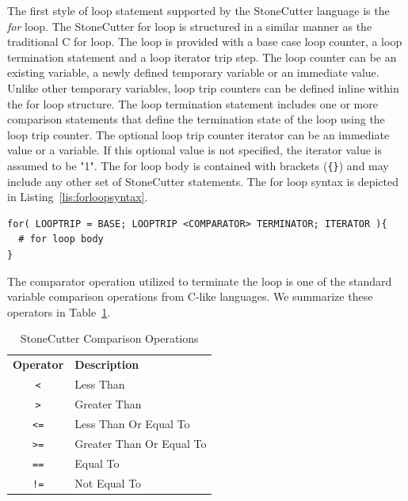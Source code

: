 \documentclass{article}
\begin{document}
The first style of loop statement supported by the StoneCutter language is the 
\textit{for} loop.  The StoneCutter for loop is structured in a similar manner as the 
traditional C for loop.  The loop is provided with a base case loop counter, a loop 
termination statement and a loop iterator trip step.  The loop counter 
can be an existing variable, a newly defined temporary variable or an immediate value.  Unlike other 
temporary variables, loop trip counters can be defined inline within the for loop 
structure.  The loop termination statement includes one or more comparison 
statements that define the termination state of the loop using the loop trip 
counter.  The optional loop trip counter iterator can be an immediate value or a variable.  
If this optional value is not specified, the iterator value is assumed to be "1".  The for loop body 
is contained with brackets (\texttt{\{\}}) and may include any other set of StoneCutter statements.  The for loop 
syntax is depicted in Listing~\ref{lis:forloopsyntax}.     

\vspace{0.125in}
\begin{lstlisting}[frame=single,style=base,caption={For Loop Syntax},captionpos=b,label={lis:forloopsyntax}]
for( LOOPTRIP = BASE; LOOPTRIP <COMPARATOR> TERMINATOR; ITERATOR ){
  # for loop body
}
\end{lstlisting}

The comparator operation utilized to terminate the loop is one of the standard 
variable comparison operations from C-like languages.  We summarize these operators in 
Table~\ref{tab:compreops}.  

\begin{table}[h]
\begin{center}
\caption{StoneCutter Comparison Operations}
\vspace{0.125in}
\label{tab:compreops}
\begin{tabular}{|c|l|}
\hline
\textbf{Operator} & \textbf{Description} \\
\texttt{<} & Less Than\\
\hline
\texttt{>} & Greater Than\\
\hline
\texttt{<=} & Less Than Or Equal To\\
\hline
\texttt{>=} & Greater Than Or Equal To\\
\hline
\texttt{==} & Equal To\\
\hline
\texttt{!=} & Not Equal To\\
\hline
\end{tabular}
\end{center}
\end{table}
\end{document}

